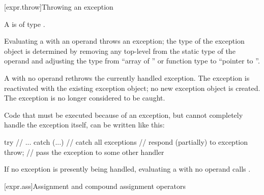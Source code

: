 [expr.throw]{Throwing an exception}%
%
%
%
%
\begin{bnf}
\br
      
\end{bnf}

\pnum
A  is of type .

\pnum
Evaluating a  with an operand throws an
exception; the type of the exception object is determined by removing
any top-level  from the static type of the
operand and adjusting the type
from ``array of '' or function type 
to ``pointer to ''.

\pnum
{}%
A
with no operand rethrows the currently handled exception.
The exception is reactivated with the existing exception object;
no new exception object is created.
The exception is no longer considered to be caught.
\begin{example}
Code that must be executed because of an exception, but cannot
completely handle the exception itself, can be written like this:
\begin{codeblock}
try {
    // ...
} catch (...) {     // catch all exceptions
  // respond (partially) to exception
  throw;            // pass the exception to some other handler
}
\end{codeblock}
\end{example}

\pnum
{}%
%
%
If no exception is presently being handled,
evaluating a
with no operand calls
.

[expr.ass]{Assignment and compound assignment operators}%

